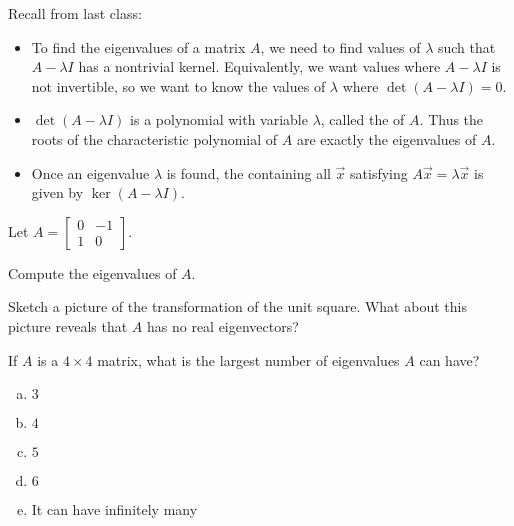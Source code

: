 


\begin{applicationActivities}{4}{28}


\begin{observation}
Recall from last class:
\begin{itemize}
\item To find the eigenvalues of a matrix $A$, we need to find values of $\lambda$ such that $A-\lambda I$ has a nontrivial kernel. Equivalently,
we want values where $A-\lambda I$ is not invertible, so we want to know
the values of \(\lambda\) where $\det(A-\lambda I)=0$.
\item $\det(A-\lambda I)$ is a polynomial with variable \(\lambda\),
called the  of $A$. Thus the roots of
the characteristic polynomial of \(A\) are exactly the eigenvalues of \(A\).
\item Once an eigenvalue \(\lambda\) is found, the 
containing all  \(\vec x\) satisfying
\(A\vec x=\lambda\vec x\) is given by $\ker(A-\lambda I)$.
\end{itemize}
\end{observation}

\begin{activity}{5}
Let  $A=\begin{bmatrix}0 & -1 \\ 1 & 0 \end{bmatrix}$.
  \begin{subactivity}
    Compute the eigenvalues of $A$.
  \end{subactivity}
  \begin{subactivity}
     Sketch a picture of the transformation of the unit square. 
     What about this picture reveals that \(A\) has no real eigenvectors?
   \end{subactivity}
\end{activity}

\begin{activity}{5}
  If $A$ is a $4 \times 4$ matrix, what is the largest number of eigenvalues $A$ can have?
  \begin{enumerate}[(a)]
  \item $3$
  \item $4$
  \item $5$
  \item $6$
  \item It can have infinitely many
  \end{enumerate}
\end{activity}


\end{applicationActivities}
